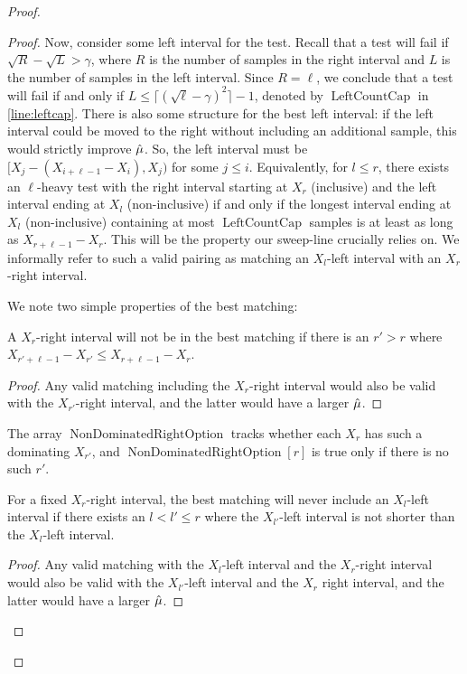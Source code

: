 \begin{proof}
\begin{proof}
        Now, consider some left interval for the test. Recall that a test will fail if $\sqrt{R}-\sqrt{L}>\gamma$, where $R$ is the number of samples in the right interval and $L$ is the number of samples in the left interval. Since $R=\ell$, we conclude that a test will fail if and only if $L \le \lceil(\sqrt{\ell}-\gamma)^2 \rceil - 1$, denoted by $\operatorname{LeftCountCap}$ in \cref{line:leftcap}. There is also some structure for the best left interval: if the left interval could be moved to the right without including an additional sample, this would strictly improve $\hat{\mu}$. So, the left interval must be $[X_j-(X_{i+\ell-1} - X_i),X_j)$ for some $j \le i$. Equivalently, for $l \le r$, there exists an $\ell$-heavy test with the right interval starting at $X_r$ (inclusive) and the left interval ending at $X_l$ (non-inclusive) if and only if the longest interval ending at $X_l$ (non-inclusive) containing at most $\operatorname{LeftCountCap}$ samples is at least as long as $X_{r+\ell-1} - X_r$. This will be the property our sweep-line crucially relies on. We informally refer to such a valid pairing as matching an $X_l$-left interval with an $X_r$-right interval. 

        We note two simple properties of the best matching:

        \begin{claim}\label{claim:right-prop}
            A $X_r$-right interval will not be in the best matching if there is an $r' > r$ where $X_{r' + \ell -1} - X_{r'} \le X_{r + \ell - 1} - X_r$.
        \end{claim}
        \begin{proof}
            Any valid matching including the $X_r$-right interval would also be valid with the $X_{r'}$-right interval, and the latter would have a larger $\hat{\mu}$.
        \end{proof}
        
        The array $\operatorname{NonDominatedRightOption}$ tracks whether each $X_r$ has such a dominating $X_{r'}$, and $\operatorname{NonDominatedRightOption}[r]$ is true only if there is no such $r'$. 
        
        \begin{claim}\label{claim:left-prop}
            For a fixed $X_r$-right interval, the best matching will never include an $X_l$-left interval if there exists an $l < l' \le r$ where the $X_{l'}$-left interval is not shorter than the $X_l$-left interval.
        \end{claim}
        \begin{proof}
            Any valid matching with the $X_l$-left interval and the $X_r$-right interval would also be valid with the $X_{l'}$-left interval and the $X_r$ right interval, and the latter would have a larger $\hat{\mu}$.
        \end{proof}


\end{proof}
\end{proof}
